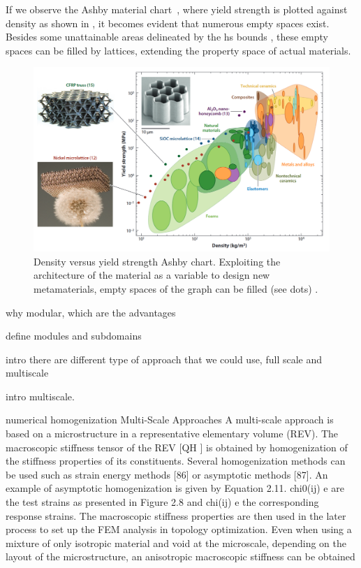 If we observe the Ashby material chart~, where yield strength is plotted against density as shown in , it becomes evident that numerous empty spaces exist. Besides some unattainable areas delineated  by the \gls{hs} bounds , these empty spaces can be filled by lattices, extending the property space of actual materials.

\begin{figure}
    \centering
    \includegraphics[width=\linewidth]{figures/02_literature/ashby_chart.png}
    \caption{Density versus yield strength Ashby chart. Exploiting the architecture of the material as a variable to design new metamaterials, empty spaces of the graph can be filled (see dots) \cite{schaedler_architected_2016}.}
    \label{fig:02_ashby_ch}
\end{figure}

why modular, which are the advantages

define modules and subdomains

intro there are different type of approach that we could use, full scale and multiscale

intro multiscale.

numerical homogenization
Multi-Scale Approaches
A multi-scale approach is based on a microstructure in a representative elementary volume (REV). The
macroscopic stiffness tensor of the REV [QH ] is obtained by homogenization of the stiffness properties of its
constituents. Several homogenization methods can be used such as strain energy methods [86] or asymptotic
methods [87]. An example of asymptotic homogenization is given by Equation 2.11. chi0(ij)
e are the test strains
as presented in Figure 2.8 and chi(ij)
e the corresponding response strains. The macroscopic stiffness properties
are then used in the later process to set up the FEM analysis in topology optimization. Even when using a
mixture of only isotropic material and void at the microscale, depending on the layout of the microstructure,
an anisotropic macroscopic stiffness can be obtained

